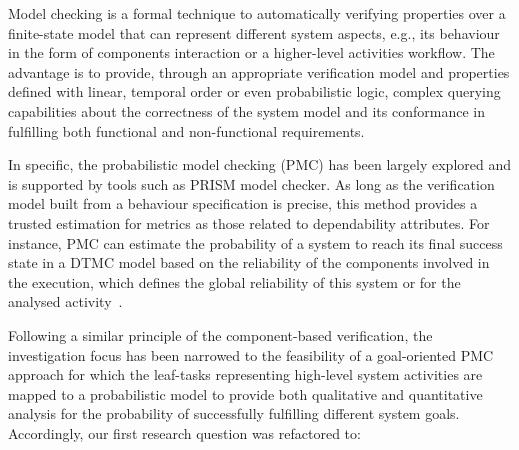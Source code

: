 


Model checking is a formal technique to automatically verifying properties over a finite-state model that can represent different system aspects, e.g., its behaviour in the form of components interaction or a higher-level activities workflow. The advantage is to provide, through an appropriate verification model and properties defined with linear, temporal order or even probabilistic logic, complex querying capabilities about the correctness of the system model and its conformance in fulfilling both functional and non-functional requirements.

In specific, the probabilistic model checking (PMC) has been largely explored and is supported by tools such as PRISM model checker. As long as the verification model built from a behaviour specification is precise, this method provides a trusted estimation for metrics as those related to dependability attributes. For instance, PMC can estimate the probability of a system to reach its final success state in a DTMC model based on the reliability of the components involved in the execution, which defines the global reliability of this system or for the analysed activity~\cite{Baier:2008, Nunes:2012}.

Following a similar principle of the component-based verification, the investigation focus has been narrowed to the feasibility of a goal-oriented PMC approach for which the leaf-tasks representing high-level system activities are mapped to a probabilistic model to provide both qualitative and quantitative analysis for the probability of successfully fulfilling different system goals. Accordingly, our first research question was refactored to:

\bigskip

\setlength{\fboxsep}{10pt}
\noindent{}\bigskip


